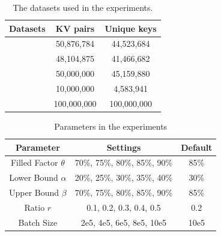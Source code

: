 \begin{table}[t]
	\caption{The datasets used in the experiments.}
	\vspace{-1.5em}
	\label{table:exp_data_sets}
	\centering
\begin{tabular}{|c|c|c|}
	\hline
	Datasets & KV pairs & Unique keys\\ \hline
	\dstwitter &50,876,784 & 44,523,684\\ \hline
	\dsreddit & 48,104,875 & 41,466,682 \\ \hline
	\dstpch &50,000,000 & 45,159,880\\ \hline
	\dsali &10,000,000 & 4,583,941\\ \hline
	\dsrandom & 100,000,000& 100,000,000 \\ \hline
\end{tabular}
\end{table}

\begin{table}[t]
	\centering
	\caption{Parameters in the experiments}
	\vspace{-1.5em}
	\label{tbl:parameters}
	\begin{tabular}{|c|c|c|}
		\hline
		\textbf{Parameter} & \textbf{Settings} & \textbf{Default} \\ \hline
		Filled Factor	$\theta$  & 70\%, 75\%, 80\%, 85\%, 90\% & 85\% \\ \hline
		Lower Bound $\alpha$ & 20\%, 25\%, 30\%, 35\%, 40\% & 30\% \\ \hline
		Upper Bound	$\beta$  & 70\%, 75\%, 80\%, 85\%, 90\% & 85\% \\ \hline
		Ratio $r$ & 0.1, 0.2, 0.3, 0.4, 0.5 & 0.2 \\ \hline
		Batch Size & 2e5, 4e5, 6e5, 8e5, 10e5 & 10e5 \\ \hline
	\end{tabular}
\end{table}

